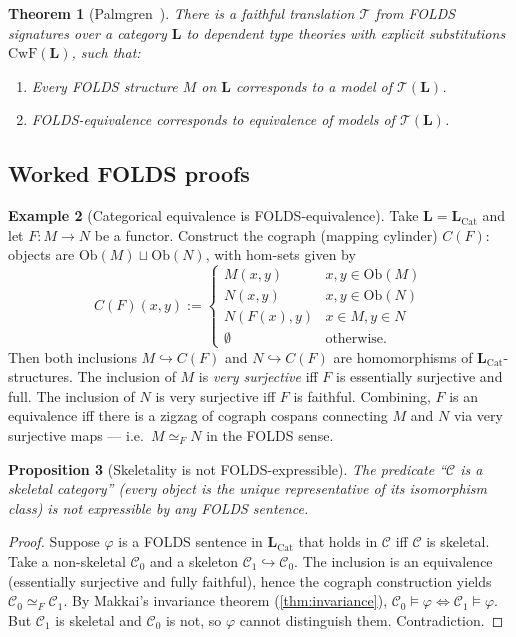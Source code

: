 \documentclass[12pt]{article}
\newtheorem{theorem}{Theorem}[section]
\newtheorem{proposition}[theorem]{Proposition}
\theoremstyle{definition}
\newtheorem{example}[theorem]{Example}
\theoremstyle{remark}
\begin{document}
\begin{theorem}[Palmgren~\cite{Palmgren2016}]
\label{thm:palmgren}
There is a faithful translation $\mathcal{T}$ from FOLDS signatures over a category
$\mathbf{L}$ to dependent type theories with explicit substitutions
$\mathrm{CwF}(\mathbf{L})$, such that:
\begin{enumerate}
\item Every FOLDS structure $M$ on $\mathbf{L}$ corresponds to a model of
$\mathcal{T}(\mathbf{L})$.
\item FOLDS-equivalence corresponds to equivalence of models of $\mathcal{T}(\mathbf{L})$.
\end{enumerate}
\end{theorem}

\subsection{Worked FOLDS proofs}

\begin{example}[Categorical equivalence is FOLDS-equivalence]
\label{ex:catequivfolds}
Take $\mathbf{L} = \mathbf{L}_{\mathrm{Cat}}$ and let $F:M\to N$ be a functor. Construct
the cograph (mapping cylinder) $C(F)$: objects are
$\mathrm{Ob}(M)\sqcup\mathrm{Ob}(N)$, with hom-sets given by
\[
C(F)(x,y) := \begin{cases}
M(x,y) & x,y\in\mathrm{Ob}(M)\\
N(x,y) & x,y\in\mathrm{Ob}(N)\\
N(F(x), y) & x\in M, y\in N\\
\emptyset & \text{otherwise.}
\end{cases}
\]
Then both inclusions $M\hookrightarrow C(F)$ and $N\hookrightarrow C(F)$ are
homomorphisms of $\mathbf{L}_{\mathrm{Cat}}$-structures. The inclusion of $M$ is
\emph{very surjective} iff $F$ is essentially surjective and full. The inclusion of $N$
is very surjective iff $F$ is faithful.  Combining, $F$ is an equivalence iff there is a
zigzag of cograph cospans connecting $M$ and $N$ via very surjective maps --- i.e.\
$M\simeq_F N$ in the FOLDS sense.
\end{example}

\begin{proposition}[Skeletality is not FOLDS-expressible]
\label{prop:skeleton-not-folds}
The predicate ``$\mathcal{C}$ is a skeletal category'' (every object is the unique
representative of its isomorphism class) is not expressible by any FOLDS sentence.
\end{proposition}
\begin{proof}
Suppose $\varphi$ is a FOLDS sentence in $\mathbf{L}_{\mathrm{Cat}}$ that holds in
$\mathcal{C}$ iff $\mathcal{C}$ is skeletal. Take a non-skeletal $\mathcal{C}_0$ and a
skeleton $\mathcal{C}_1\hookrightarrow \mathcal{C}_0$. The inclusion is an
equivalence (essentially surjective and fully faithful), hence the cograph construction
yields $\mathcal{C}_0 \simeq_F \mathcal{C}_1$. By Makkai's invariance theorem
(\cref{thm:invariance}), $\mathcal{C}_0\models \varphi \Leftrightarrow \mathcal{C}_1
\models\varphi$. But $\mathcal{C}_1$ is skeletal and $\mathcal{C}_0$ is not, so $\varphi$
cannot distinguish them. Contradiction.
\end{proof}
\end{document}
